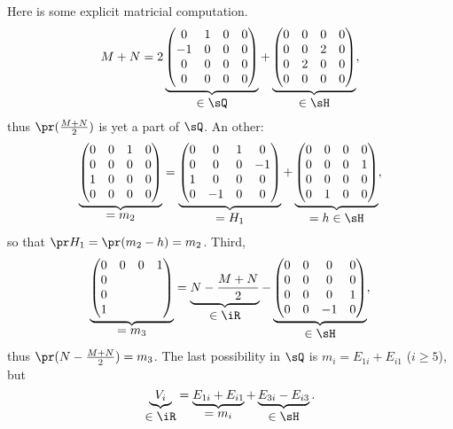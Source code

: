 Here is some explicit matricial computation.
\[
   M+N=2
 \underbrace{
\begin{pmatrix}
  0 &1&0&0\\
  -1&0&0&0\\
  0 &0&0&0\\
  0 &0&0&0
\end{pmatrix}}_{\displaystyle\in\sQ}
+
\underbrace{
\begin{pmatrix}
  0&0&0&0\\
  0&0&2&0\\
  0&2&0&0\\
  0&0&0&0
\end{pmatrix}}_{\displaystyle\in\sH},
\]
thus $\pr(\frac{M+N}{2})$ is yet a part of $\sQ$. An other:
\[
 \underbrace{
\begin{pmatrix}
  0 &0&1&0\\
  0&0&0&0\\
  1 &0&0&0\\
  0 &0&0&0
\end{pmatrix}}_{\displaystyle =m_2}
= \underbrace{
\begin{pmatrix}
  0 &0  &1 &0\\
  0 &0  &0 &-1\\
  1 & 0 &0 &0\\
  0 &-1 &0 &0
\end{pmatrix}}_{\displaystyle =H_1}
+
\underbrace{
\begin{pmatrix}
  0&0&0&0\\
  0&0&0&1\\
  0&0&0&0\\
  0&1&0&0
\end{pmatrix}}_{\displaystyle =h\in\sH},
\]
so that $\pr H_1=\pr(m_2-h)=m_2$. Third,
\[
\underbrace{
\begin{pmatrix}
 0&0&0&1\\
 0\\
 0\\
 1
\end{pmatrix}}_{\displaystyle=m_3}
=
\underbrace{N-\frac{M+N}{2}}_{\displaystyle\in\iR}
-
\underbrace{%
\begin{pmatrix}
  0&0&0 &0\\
  0&0&0 &0\\
  0&0&0 &1\\
  0&0&-1&0\\
\end{pmatrix}}_{\displaystyle\in\sH},
\]
thus $\pr(N-\frac{M+N}{2})=m_3$. The last possibility in $\sQ$ is $m_i=E_{1i}+E_{i1}$ ($i\geq 5$), but
\[
  \underbrace{V_i}_{\displaystyle\in\iR}
    =\underbrace{E_{1i}+E_{i1}}_{\displaystyle =m_i}+\underbrace{E_{3i}-E_{i3}}_{\displaystyle\in\sH}.
\]


